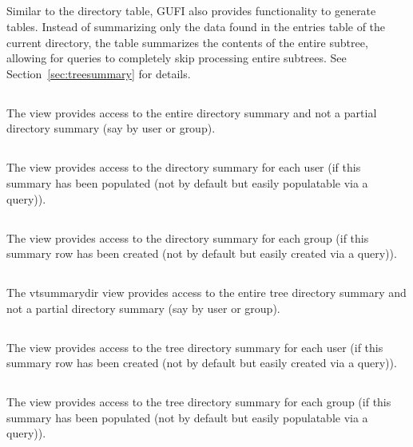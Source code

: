 \subsection{\treesummary}
Similar to the directory \summary table, GUFI also provides
functionality to generate \treesummary tables. Instead of summarizing
only the data found in the entries table of the current directory, the
\treesummary table summarizes the contents of the entire subtree,
allowing for queries to completely skip processing entire
subtrees. See Section~\ref{sec:treesummary} for details.

\subsection{\vsummarydir}
The \vsummarydir view provides access to the entire directory summary
and not a partial directory summary (say by user or group).

\subsection{\vsummaryuser}
The \vsummaryuser view provides access to the directory summary for
each user (if this summary has been populated (not by default but
easily populatable via a query)).

\subsection{\vsummarygroup}
The \vsummarygroup view provides access to the directory summary for
each group (if this summary row has been created (not by default but
easily created via a query)).

\subsection{\vtsummarydir}
The vtsummarydir view provides access to the entire tree directory
summary and not a partial directory summary (say by user or group).

\subsection{\vtsummaryuser}
The \vtsummaryuser view provides access to the tree directory summary
for each user (if this summary row has been created (not by default
but easily created via a query)).

\subsection{\vtsummarygroup}
The \vtsummarygroup view provides access to the tree directory summary
for each group (if this summary has been populated (not by default but
easily populatable via a query)).

